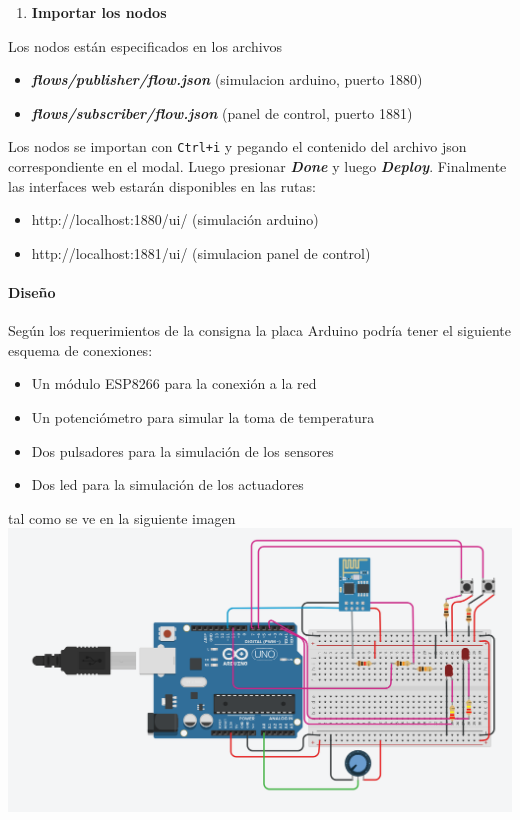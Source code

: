 \documentclass[11pt]{extarticle}
\providecommand{\tightlist}{%
      \setlength{\itemsep}{0pt}\setlength{\parskip}{0pt}}
\begin{document}
\begin{enumerate}
\def\labelenumi{\arabic{enumi})}
\setcounter{enumi}{1}
\tightlist
\item
  \textbf{Importar los nodos}
\end{enumerate}

Los nodos están especificados en los archivos

\begin{itemize}
\item
  \textbf{\emph{flows/publisher/flow.json}} (simulacion arduino, puerto
  1880)
\item
  \textbf{\emph{flows/subscriber/flow.json}} (panel de control, puerto
  1881)
\end{itemize}

Los nodos se importan con \texttt{Ctrl+i} y pegando el contenido del
archivo json correspondiente en el modal. Luego presionar
\textbf{\emph{Done}} y luego \textbf{\emph{Deploy}}. Finalmente las
interfaces web estarán disponibles en las rutas:

\begin{itemize}
\item
  http://localhost:1880/ui/ (simulación arduino)
\item
  http://localhost:1881/ui/ (simulacion panel de control)
\end{itemize}

    \hypertarget{diseuxf1o}{%
\paragraph{Diseño}\label{diseuxf1o}}

Según los requerimientos de la consigna la placa Arduino podría tener el
siguiente esquema de conexiones:

\begin{itemize}
\item
  Un módulo ESP8266 para la conexión a la red
\item
  Un potenciómetro para simular la toma de temperatura
\item
  Dos pulsadores para la simulación de los sensores
\item
  Dos led para la simulación de los actuadores
\end{itemize}

tal como se ve en la siguiente imagen\\

    \includegraphics{images/placa.png}\\
\end{document}
